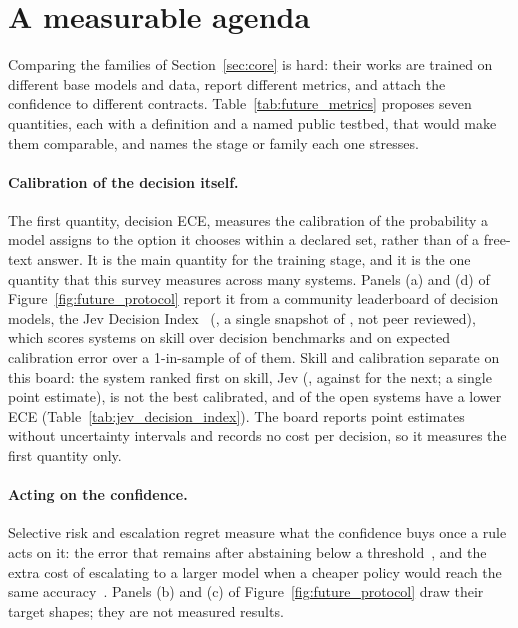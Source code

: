 \section{A measurable agenda}
\label{sec:future}

Comparing the families of Section~\ref{sec:core} is hard: their works are trained on different base
models and data, report different metrics, and attach the confidence to different
contracts. Table~\ref{tab:future_metrics} proposes seven quantities, each with a definition and a named
public testbed, that would make them comparable, and names the stage or family each one stresses.



\paragraph{Calibration of the decision itself.} The first quantity, decision ECE, measures the
calibration of the probability a model assigns to the option it chooses within a declared set, rather
than of a free-text answer. It is the main quantity for the training stage, and it is the one quantity
that this survey measures across many systems. Panels (a) and (d) of Figure~\ref{fig:future_protocol}
report it from a community leaderboard of decision models, the Jev Decision
Index~\citep{multimodalart2026jevdi} (\diRelease, a single snapshot of \diDate,
not peer reviewed), which scores \nDISystems systems on skill over \nDIBench decision benchmarks and on
expected calibration error over a 1-in-\nDIOneIn sample of \nDICalBench of them. Skill and calibration
separate on this board: the system ranked first on skill, Jev (\diTopSkill, against \diSecondSkill for the next;
a single point estimate), is not the best calibrated, and
\nDILowerECE of the \nDIOpen open systems have a lower ECE (Table~\ref{tab:jev_decision_index}). The
board reports point estimates without uncertainty intervals and records no cost per decision, so it
measures the first quantity only.



\paragraph{Acting on the confidence.} Selective risk and escalation regret measure what the confidence
buys once a rule acts on it: the error that remains after abstaining below a
threshold~\citep{geifman2017selective}, and the extra cost of escalating to a larger model when a
cheaper policy would reach the same accuracy~\citep{hu2024routerbench}. Panels (b) and (c) of
Figure~\ref{fig:future_protocol} draw their target shapes; they are not measured results.

